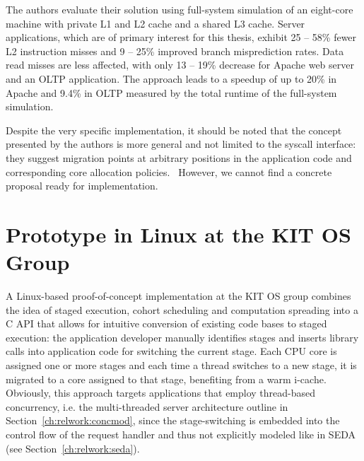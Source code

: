 \documentclass[12pt,a4paper]{book}
\begin{document}
The authors evaluate their solution using full-system simulation of an eight-core machine with private L1 and L2 cache and a shared L3 cache.
Server applications, which are of primary interest for this thesis, exhibit 25 -- 58\% fewer L2 instruction misses and 9 -- 25\% improved branch misprediction rates.
Data read misses are less affected, with only 13 -- 19\% decrease for Apache web server and an OLTP application.
The approach leads to a speedup of up to 20\% in Apache and 9.4\% in OLTP measured by the total runtime of the full-system simulation.~\cite{compspr}

Despite the very specific implementation, it should be noted that the concept presented by the authors is more general and not limited to the syscall interface:
they suggest migration points at arbitrary positions in the application code and corresponding core allocation policies.~\cite{compspr}
However, we cannot find a concrete proposal ready for implementation.


\section{Prototype in Linux at the KIT OS Group}\label{ch:relwork:kitpoc}
\NewDocumentCommand{\klt}{}{\textsc{klt}\xspace}
\NewDocumentCommand{\klts}{}{\textsc{klt}s\xspace}
\NewDocumentCommand{\ult}{}{\textsc{ult}\xspace}
\NewDocumentCommand{\ults}{}{\textsc{ult}s\xspace}
A Linux-based proof-of-concept implementation at the KIT OS group combines the idea of staged execution, cohort scheduling and computation spreading into a C API that allows for intuitive conversion of existing code bases to staged execution:
the application developer manually identifies stages and inserts library calls into application code for switching the current stage.
Each CPU core is assigned one or more stages and each time a thread switches to a new stage, it is migrated to a core assigned to that stage, benefiting from a warm i-cache.
Obviously, this approach targets applications that employ thread-based concurrency, i.e. the multi-threaded server architecture outline in Section~\ref{ch:relwork:concmod}, since the stage-switching is embedded into the control flow of the request handler and thus not explicitly modeled like in SEDA (see Section~\ref{ch:relwork:seda}).
\end{document}

